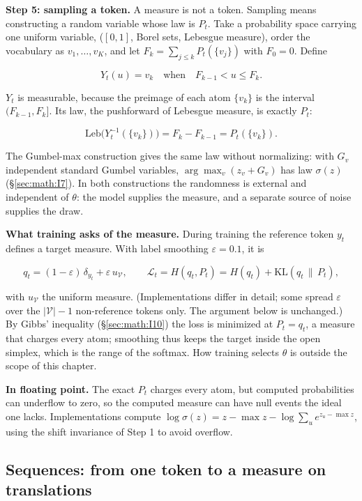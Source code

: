 \textbf{Step 5: sampling a token.} A measure is not a token. Sampling
means constructing a random variable whose law is \(P_t\). Take a
probability space carrying one uniform variable, (\([0, 1]\), Borel
sets, Lebesgue measure), order the vocabulary as \(v_{1}, \ldots,
v_K\), and let \(F_k = \sum_{j\le k} P_t(\{v_j\})\) with \(F_{0} = 0\). Define

\[
Y_t(u) = v_k \quad\text{when}\quad F_{k-1} < u \le F_k .
\]

\(Y_t\) is measurable, because the preimage of each atom \(\{v_k\}\) is the
interval \((F_{k-1}, F_k]\). Its law, the pushforward of Lebesgue
measure, is exactly \(P_t\):

\[
\mathrm{Leb}\big(Y_t^{-1}(\{v_k\})\big) = F_k - F_{k-1} = P_t(\{v_k\}).
\]

The Gumbel-max construction gives the same law without normalizing: with
\(G_v\) independent standard Gumbel variables, \(\arg\max_v (z_v + G_v)\) has
law \(\sigma(z)\) (\S\ref{sec:math:I7}). In both constructions the randomness is external and
independent of \(\theta\): the model supplies the measure, and a separate source
of noise supplies the draw.

\textbf{What training asks of the measure.} During training the
reference token \(y_t\) defines a target measure. With label smoothing \(\varepsilon =
0.1\), it is

\[
q_t = (1-\varepsilon)\,\delta_{y_t} + \varepsilon\, u_{\mathcal V}, \qquad \mathcal L_t = H(q_t, P_t) = H(q_t) + \mathrm{KL}(q_t \,\|\, P_t),
\]

with \(u_{\mathcal{V}}\) the uniform measure. (Implementations differ in detail; some
spread \(\varepsilon\) over the \(|\mathcal{V}|-1\) non-reference tokens only. The argument
below is unchanged.) By Gibbs' inequality
(\S\ref{sec:math:I10}) the loss is minimized at \(P_t = q_t\), a measure that charges
every atom; smoothing thus keeps the target inside the open simplex,
which is the range of the softmax. How training selects \(\theta\) is outside the
scope of this chapter.

\textbf{In floating point.} The exact \(P_t\) charges every atom, but
computed probabilities can underflow to zero, so the computed measure
can have null events the ideal one lacks. Implementations compute \(\log
\sigma(z) = z - \max z - \log \sum_u e^{z_u - \max z}\), using the shift
invariance of Step 1 to avoid overflow.

\subsection{Sequences: from one token to a measure on
translations}\label{sec:math:IV6}

